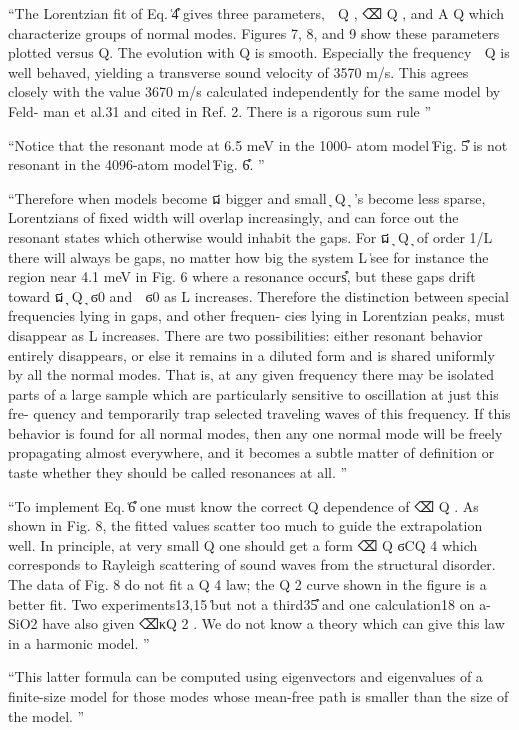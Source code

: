 \documentclass[aps,prb,preprint,superscriptaddress,amsmath,amssymb,floatfix]{revtex4}
\begin{document}
``The Lorentzian fit of Eq. ͑4͒ gives three parameters,
␻ Q , ⌫ Q , and A Q which characterize groups of normal
modes. Figures 7, 8, and 9 show these parameters plotted
versus Q. The evolution with Q is smooth. Especially the
frequency ␻ Q is well behaved, yielding a transverse sound
velocity of 3570 m/s. This agrees closely with the value 3670
m/s calculated independently for the same model by Feld-
man et al.31 and cited in Ref. 2. There is a rigorous sum rule
''

``Notice that the resonant mode at 6.5 meV in the 1000-
atom model ͑Fig. 5͒ is not resonant in the 4096-atom model
͑Fig. 6͒. 
''

``Therefore when models become
ជ
bigger and small ͉ Q ͉ ’s become less sparse, Lorentzians of
fixed width will overlap increasingly, and can force out the
resonant states which otherwise would inhabit the gaps. For
ជ
͉ Q ͉ of order 1/L there will always be gaps, no matter how
big the system L ͑see for instance the region near 4.1 meV in
Fig. 6 where a resonance occurs͒, but these gaps drift toward
ជ
͉ Q ͉ ϭ0 and ␻ ϭ0 as L increases. Therefore the distinction
between special frequencies lying in gaps, and other frequen-
cies lying in Lorentzian peaks, must disappear as L increases.
There are two possibilities: either resonant behavior entirely
disappears, or else it remains in a diluted form and is shared
uniformly by all the normal modes. That is, at any given
frequency there may be isolated parts of a large sample
which are particularly sensitive to oscillation at just this fre-
quency and temporarily trap selected traveling waves of this
frequency. If this behavior is found for all normal modes,
then any one normal mode will be freely propagating almost
everywhere, and it becomes a subtle matter of definition or
taste whether they should be called resonances at all.
''

``To implement Eq. ͑6͒ one must know the
correct Q dependence of ⌫ Q . As shown in Fig. 8, the fitted
values scatter too much to guide the extrapolation well. In
principle, at very small Q one should get a form ⌫ Q ϭCQ 4
which corresponds to Rayleigh scattering of sound waves
from the structural disorder. The data of Fig. 8 do not fit a
Q 4 law; the Q 2 curve shown in the figure is a better fit. Two
experiments13,15 ͑but not a third35͒ and one calculation18 on
a-SiO2 have also given ⌫κQ 2 . We do not know a theory
which can give this law in a harmonic model.
''

``This latter formula
can be computed using eigenvectors and eigenvalues of a
finite-size model for those modes whose mean-free path is
smaller than the size of the model.
''
\end{document}

